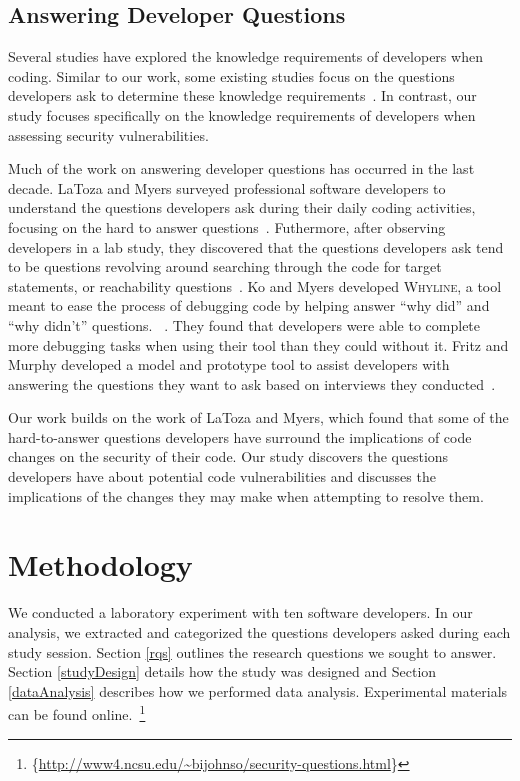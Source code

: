 \documentclass[conference]{IEEEtran}
\newcommand{\blind}[1]{{\color{white}\{#1\}}}
\begin{document}
\subsection{Answering Developer Questions}
\label{questions}
Several studies have explored the knowledge requirements of developers when coding.
Similar to our work, some existing studies focus on the questions developers ask to determine these knowledge requirements~\cite{latoza2010hard, latoza2010developers}.
In contrast, our study focuses specifically on the knowledge requirements of developers when assessing security vulnerabilities.


Much of the work on answering developer questions has occurred in the last decade. 
LaToza and Myers surveyed professional software developers to understand the questions developers ask during their daily coding activities, focusing on the hard to answer questions~\cite{latoza2010hard}. 
Futhermore, after observing developers in a lab study, they discovered that the questions developers ask tend to be questions revolving around searching through the code for target statements, or reachability questions~\cite{latoza2010developers}. 
Ko and Myers developed \textsc{Whyline}, a tool meant to ease the process of debugging code by helping answer ``why did'' and ``why didn't'' questions. ~\cite{ko2004designing}. 
They found that developers were able to complete more debugging tasks when using their tool than they could without it.
Fritz and Murphy developed a model and prototype tool to assist developers with answering the questions they want to ask based on interviews they conducted~\cite{fritz2010using}.

Our work builds on the work of LaToza and Myers, which found that some of the hard-to-answer questions developers have surround the implications of code changes on the security of their code. 
Our study discovers the questions developers have about potential code vulnerabilities and discusses the implications of the changes they may make when attempting to resolve them. 

\section{Methodology}
\label{sec:meth}
We conducted a laboratory experiment with ten software developers. In our analysis, we extracted and categorized the questions developers asked during each study session. 
Section \ref{rqs} outlines the research questions we sought to answer. 
Section \ref{studyDesign} details how the study was designed and Section \ref{dataAnalysis} describes how we performed data analysis.
Experimental materials can be found online.~\footnote{\blind{\url{http://www4.ncsu.edu/~bijohnso/security-questions.html}}}
\end{document}
